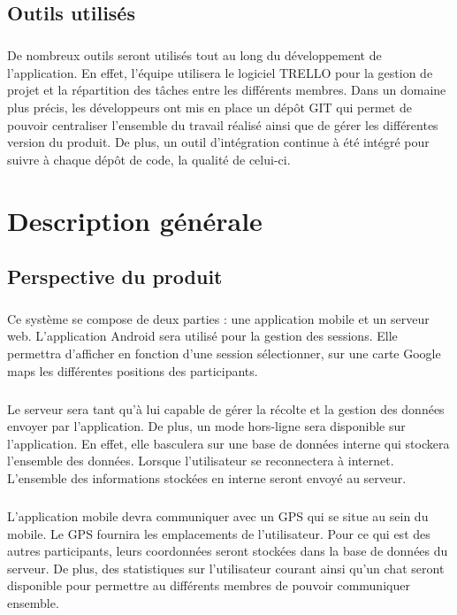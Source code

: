 \documentclass[titlepage, 12pt]{report}
\begin{document}
\section{Outils utilisés}

\paragraph{}De nombreux outils seront utilisés tout au long du développement de l'application. En effet, l'équipe utilisera le logiciel TRELLO pour la gestion de projet et la répartition des tâches entre les différents membres. Dans un domaine plus précis, les développeurs ont mis en place un dépôt GIT qui permet de pouvoir centraliser l'ensemble du travail réalisé ainsi que de gérer les différentes version du produit. De plus, un outil d'intégration continue à été intégré pour suivre à chaque dépôt de code, la qualité de celui-ci.

\chapter{Description générale}

\section{Perspective du produit}

\paragraph{}Ce système se compose de deux parties : une application mobile et un serveur web.
L'application Android sera utilisé pour la gestion des sessions. Elle permettra d'afficher en fonction d'une session sélectionner, sur une carte Google maps les différentes positions des participants.
\paragraph{}Le serveur sera tant qu'à lui capable de gérer la récolte et la gestion des données envoyer par l'application.
De plus, un mode hors-ligne sera disponible sur l'application. En effet, elle basculera sur une base de données interne qui stockera l'ensemble des données. Lorsque l'utilisateur se reconnectera à internet. L'ensemble des informations stockées en interne seront envoyé au serveur.
\paragraph{}L'application mobile devra communiquer avec un GPS qui se situe au sein du mobile. Le GPS fournira les emplacements de l'utilisateur. Pour ce qui est des autres participants, leurs coordonnées seront stockées dans la base de données du serveur. De plus, des statistiques sur l'utilisateur courant ainsi qu'un chat seront disponible pour permettre au différents membres de pouvoir communiquer ensemble.
\end{document}
